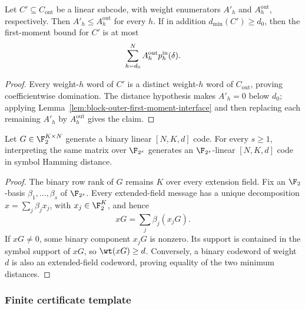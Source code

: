 \begin{lemma}
\label{lem:block-outer-subcode-domination}
Let \(C'\subseteq C_{\mathrm{out}}\) be a linear subcode, with weight
enumerators \(A'_h\) and \(A_h^{\mathrm{out}}\), respectively.  Then
\(A'_h\le A_h^{\mathrm{out}}\) for every \(h\).  If in addition
\(d_{\min}(C')\ge d_0\), then the first-moment bound for \(C'\) is at most
\[
 \sum_{h=d_0}^{N}A_h^{\mathrm{out}}p_h^{\rm in}(\delta).
\]
\end{lemma}

\begin{proof}
Every weight-\(h\) word of \(C'\) is a distinct weight-\(h\) word of
\(C_{\mathrm{out}}\), proving coefficientwise domination.  The distance
hypothesis makes \(A'_h=0\) below \(d_0\); applying
Lemma~\ref{lem:block-outer-first-moment-interface} and then replacing each
remaining \(A'_h\) by \(A_h^{\mathrm{out}}\) gives the claim.
\end{proof}

\begin{lemma}
\label{lem:binary-code-scalar-extension}
Let \(G\in\F_2^{K\times N}\) generate a binary linear \([N,K,d]\) code.
For every \(s\ge1\), interpreting the same matrix over \(\F_{2^s}\) generates
an \(\F_{2^s}\)-linear \([N,K,d]\) code in symbol Hamming distance.
\end{lemma}

\begin{proof}
The binary row rank of \(G\) remains \(K\) over every extension field.  Fix an
\(\F_2\)-basis \(\beta_1,\ldots,\beta_s\) of \(\F_{2^s}\).  Every extended-field
message has a unique decomposition \(x=\sum_j\beta_jx_j\), with
\(x_j\in\F_2^K\), and hence
\[
 xG=\sum_j\beta_j(x_jG).
\]
If \(xG\ne0\), some binary component \(x_jG\) is nonzero.  Its support is
contained in the symbol support of \(xG\), so \(\wt(xG)\ge d\).  Conversely,
a binary codeword of weight \(d\) is also an extended-field codeword, proving
equality of the two minimum distances.
\end{proof}

\subsubsection{Finite certificate template}
\label{subsec:local-code-certificate-template}

